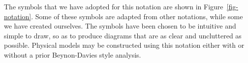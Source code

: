 \documentclass{CRPITStyle}
\begin{document}
The symbols that we have adopted for this notation are shown in
Figure~\ref{fig-notation}. Some of these symbols are adapted from other
notations, while some we have created ourselves. The symbols have been
chosen to be intuitive and simple to draw, so as to produce diagrams
that are as clear and uncluttered as possible. Physical models may be
constructed using this notation either with or without a prior
Beynon-Davies style analysis.

\begin{figure}[htb]
\end{figure}
\end{document}
